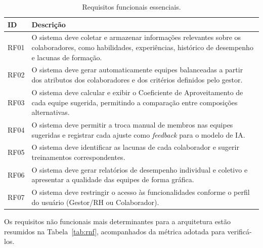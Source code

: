 \documentclass[a4paper,12pt,oneside,openany]{book}
\begin{document}
\begin{table}[H]
\centering
\caption{Requisitos funcionais essenciais.}
\label{tab:rf}
\begin{tabularx}{0.95\textwidth}{p{} X}
\toprule
\textbf{ID} & \textbf{Descrição} \\
\midrule
RF01 & O sistema deve coletar e armazenar informações relevantes sobre os
colaboradores, como habilidades, experiências, histórico de desempenho e
lacunas de formação. \\
RF02 & O sistema deve gerar automaticamente equipes balanceadas a partir dos
atributos dos colaboradores e dos critérios definidos pelo gestor. \\
RF03 & O sistema deve calcular e exibir o Coeficiente de Aproveitamento de cada
equipe sugerida, permitindo a comparação entre composições alternativas. \\
RF04 & O sistema deve permitir a troca manual de membros nas equipes sugeridas e
registrar cada ajuste como \textit{feedback} para o modelo de IA. \\
RF05 & O sistema deve identificar as lacunas de cada colaborador e sugerir
treinamentos correspondentes. \\
RF06 & O sistema deve gerar relatórios de desempenho individual e coletivo e
apresentar a qualidade das equipes de forma gráfica. \\
RF07 & O sistema deve restringir o acesso às funcionalidades conforme o perfil do
usuário (Gestor/RH ou Colaborador). \\
\bottomrule
\end{tabularx}
\end{table}

Os requisitos não funcionais mais determinantes para a arquitetura estão
resumidos na Tabela~\ref{tab:rnf}, acompanhados da métrica adotada para
verificá-los.
\end{document}
